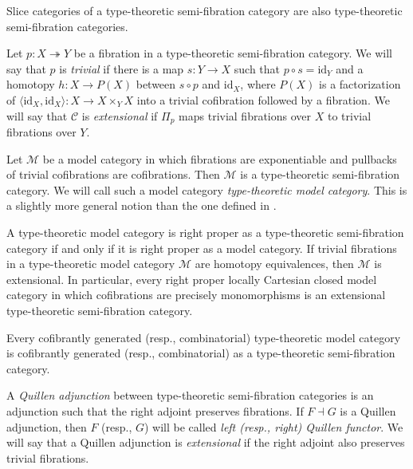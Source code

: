 \documentclass[reqno]{amsart}
\theoremstyle{definition}
\theoremstyle{remark}
\newcommand{\fs}[1]{\mathrm{#1}}
\newcommand{\scat}[1]{\mathcal{#1}}
\newcommand{\id}{\fs{id}}
\numberwithin{figure}{section}
\begin{document}
\begin{remark}
Slice categories of a type-theoretic semi-fibration category are also type-theoretic semi-fibration categories.
\end{remark}

Let $p : X \twoheadrightarrow Y$ be a fibration in a type-theoretic semi-fibration category.
We will say that $p$ is \emph{trivial} if there is a map $s : Y \to X$ such that $p \circ s = \id_Y$ and a homotopy $h : X \to P(X)$ between $s \circ p$ and $\id_X$,
where $P(X)$ is a factorization of $\langle \id_X, \id_X \rangle : X \to X \times_Y X$ into a trivial cofibration followed by a fibration.
We will say that $\scat{C}$ is \emph{extensional} if $\Pi_p$ maps trivial fibrations over $X$ to trivial fibrations over $Y$.

\begin{example}
Let $\scat{M}$ be a model category in which fibrations are exponentiable and pullbacks of trivial cofibrations are cofibrations.
Then $\scat{M}$ is a type-theoretic semi-fibration category.
We will call such a model category \emph{type-theoretic model category}.
This is a slightly more general notion than the one defined in \cite[Definition~2.12]{shul-inv}.

A type-theoretic model category is right proper as a type-theoretic semi-fibration category if and only if it is right proper as a model category.
If trivial fibrations in a type-theoretic model category $\scat{M}$ are homotopy equivalences, then $\scat{M}$ is extensional.
In particular, every right proper locally Cartesian closed model category in which cofibrations are precisely monomorphisms is an extensional type-theoretic semi-fibration category.

Every cofibrantly generated (resp., combinatorial) type-theoretic model category is cofibrantly generated (resp., combinatorial) as a type-theoretic semi-fibration category.
\end{example}

\begin{defn}
A \emph{Quillen adjunction} between type-theoretic semi-fibration categories is an adjunction such that the right adjoint preserves fibrations.
If $F \dashv G$ is a Quillen adjunction, then $F$ (resp., $G$) will be called \emph{left (resp., right) Quillen functor}.
We will say that a Quillen adjunction is \emph{extensional} if the right adjoint also preserves trivial fibrations.
\end{defn}
\end{document}
